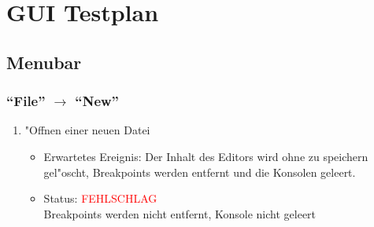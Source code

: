 \section{GUI Testplan}
\subsection{Menubar}
\subsubsection{"`File"' $\rightarrow$ "`New"'}
\begin{enumerate}
\item "Offnen einer neuen Datei
\begin{itemize}
\item Erwartetes Ereignis: Der Inhalt des Editors wird ohne zu speichern gel"oscht, Breakpoints werden entfernt und die Konsolen geleert. 
\item Status: \textcolor{red}{FEHLSCHLAG} \\
Breakpoints werden nicht entfernt, Konsole nicht geleert
\end{itemize}
\end{enumerate}
